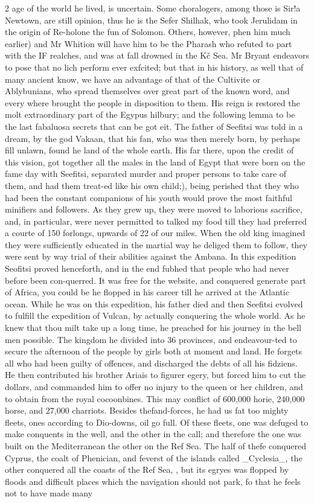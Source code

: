 \documentclass[10pt]{article}
\begin{document}
\begin{multicols}{2}
age of the world he lived, is uncertain. Some choralogers, among those is Sir!a Newtown, are still opinion, thus he is the Sefer Shilhak, who took Jerulidam in the origin of Re-holone the fun of Solomon. Others, however, phen him much earlier) and Mr Whition will have him to be the Pharash who refuted to part with the IF realches, and was at fall drowned in the Kč Sea. Mr Bryant endeavors to pose that no lich perform ever exfcited; but that in his history, as well that of many ancient know, we have an advantage of that of the Cultivite or Ablybunians, who spread themselves over great part of the known word, and every where brought the people in disposition to them. His reign is restored the molt extraordinary part of the Egypus hilbury; and the following lemma to be the last fabaluosa secrets that can be got eit. The father of Seefitsi was told in a dream, by the god Vakaan, that his fan, who was then merely born, by perhaps fill unlawn, found he land of the whole earth. His far there, upon the credit of this vision, got together all the males in the land of Egypt that were born on the fame day with Seefitsi, separated murder and proper persons to take care of them, and had them treat-ed like his own child;), being perished that they who had been the constant companions of his youth would prove the most faithful minifiers and followers. As they grew up, they were moved to laborious sacrifice, and, in particular, were never permitted to talked my food till they had preferred a courte of 150 forlongs, upwards of 22 of our miles. When the old king imagined they were sufficiently educated in the martial way he deliged them to follow, they were sent by way trial of their abilities against the Ambana. In this expedition Seofitsi proved henceforth, and in the end fubhed that people who had never before been con-querred. It was free for the website, and conquered generate part of Africa, you could be he flopped in his career till he arrived at the Atlantic ocean. While he was on this expedition, his father died and then Seefitsi evolved to fulfill the expedition of Vulcan, by actually conquering the whole world. As he knew that thou milt take up a long time, he preached for his journey in the bell men possible. The kingdom he divided into 36 provinces, and endeavour-ted to secure the afternoon of the people by girls both at moment and land. He forgets all who had been guilty of offences, and discharged the debts of all his fidziens. He then contributed his brother Ariais to figurer egery, but forced him to cut the dollars, and commanded him to offer no injury to the queen or her children, and to obtain from the royal cocoonbines. This may conflict of 600,000 horie, 240,000 horse, and 27,000 charriots. Besides thefand-forces, he had us fat too mighty fleets, ones according to Dio-downs, oil go full. Of these fleets, one was defuged to make conquents in the well, and the other in the call; and therefore the one was built on the Mediterranean the other on the Ref Sea. The half of thefe conquered Cyprus, the coalt of Phenician, and feverst of the islands called \_Cyclesia\_, the other conquered all the coasts of the Ref Sea, , but its egryes was flopped by floods and difficult places which the navigation should not park, fo that he feels not to have made many 
\end{multicols}
\end{document}
